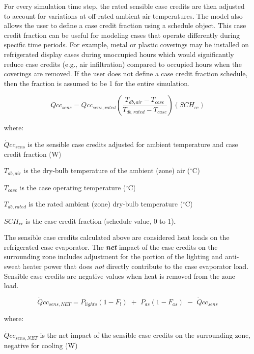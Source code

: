 For every simulation time step, the rated sensible case credits are then adjusted to account for variations at off-rated ambient air temperatures. The model also allows the user to define a case credit fraction using a schedule object. This case credit fraction can be useful for modeling cases that operate differently during specific time periods. For example, metal or plastic coverings may be installed on refrigerated display cases during unoccupied hours which would significantly reduce case credits (e.g., air infiltration) compared to occupied hours when the coverings are removed. If the user does not define a case credit fraction schedule, then the fraction is assumed to be 1 for the entire simulation.

\begin{equation}
\dot Qc{c_{sens}} = \dot Qc{c_{sens,rated}}\left( {\frac{{{T_{db,air}} - {T_{case}}}}{{{T_{db,rated}} - {T_{case}}}}} \right)\left( {SC{H_{cc}}} \right)
\end{equation}

where:

\(\dot Qc{c_{sens}}\) is the sensible case credits adjusted for ambient temperature and case credit fraction (W)

\({T_{db,air}}\) is the dry-bulb temperature of the ambient (zone) air (\(^{\circ}\)C)

\({T_{case}}\) is the case operating temperature (\(^{\circ}\)C)

\({T_{db,rated}}\) is the rated ambient (zone) dry-bulb temperature (\(^{\circ}\)C)

\(SC{H_{cc}}\) is the case credit fraction (schedule value, 0 to 1).

The sensible case credits calculated above are considered heat loads on the refrigerated case evaporator. The \textbf{\emph{net}} impact of the case credits on the surrounding zone includes adjustment for the portion of the lighting and anti-sweat heater power that does \emph{not} directly contribute to the case evaporator load. Sensible case credits are negative values when heat is removed from the zone load.

\begin{equation}
\dot Qc{c_{sens,NET}} = {P_{lights}}(1 - {F_l})\,\, + \,\,{P_{as}}(1 - {F_{as}})\,\, - \,\,\dot Qc{c_{sens}}
\end{equation}

where:

\(\dot Qc{c_{sens,NET}}\) is the net impact of the sensible case credits on the surrounding zone, negative for cooling (W)

